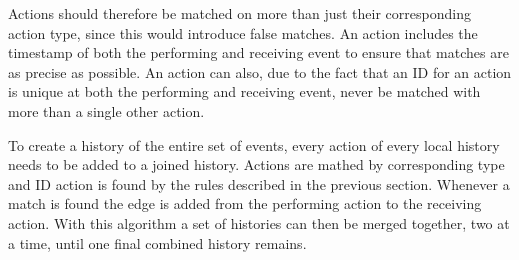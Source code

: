 	Actions should therefore be matched on more than just their corresponding action type, since this would introduce false matches. An action includes the timestamp of both the performing and receiving event to ensure that matches are as precise as possible.
	An action can also, due to the fact that an ID for an action is unique at both the performing and receiving event, never be matched with more than a single other action. 
	
	To create a history of the entire set of events, every action of every local history needs to be added to a joined history. Actions are mathed by corresponding type and ID action is found by the rules described in the previous section. Whenever a match is found the edge is added from the performing action to the receiving action. With this algorithm a set of histories can then be merged together, two at a time, until one final combined history remains.